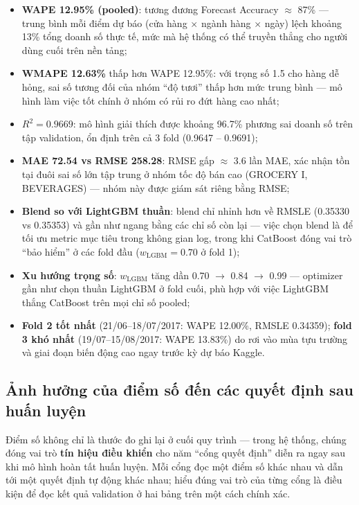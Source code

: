 \documentclass[12pt,a4paper]{report}
\begin{document}
\begin{itemize}
    \item \textbf{WAPE 12.95\% (pooled)}: tương đương Forecast Accuracy $\approx$ 87\% --- trung bình mỗi điểm dự báo (cửa hàng $\times$ ngành hàng $\times$ ngày) lệch khoảng 13\% tổng doanh số thực tế, mức mà hệ thống có thể truyền thẳng cho người dùng cuối trên nền tảng;
    \item \textbf{WMAPE 12.63\%} thấp hơn WAPE 12.95\%: với trọng số 1.5 cho hàng dễ hỏng, sai số tương đối của nhóm ``độ tươi'' thấp hơn mức trung bình --- mô hình làm việc tốt chính ở nhóm có rủi ro đứt hàng cao nhất;
    \item \textbf{$R^2 = 0.9669$}: mô hình giải thích được khoảng 96.7\% phương sai doanh số trên tập validation, ổn định trên cả 3 fold (0.9647 -- 0.9691);
    \item \textbf{MAE 72.54 vs RMSE 258.28}: RMSE gấp $\approx$ 3.6 lần MAE, xác nhận tồn tại đuôi sai số lớn tập trung ở nhóm tốc độ bán cao (GROCERY I, BEVERAGES) --- nhóm này được giám sát riêng bằng RMSE;
    \item \textbf{Blend so với LightGBM thuần}: blend chỉ nhỉnh hơn về RMSLE (0.35330 vs 0.35353) và gần như ngang bằng các chỉ số còn lại --- việc chọn blend là để tối ưu metric mục tiêu trong không gian log, trong khi CatBoost đóng vai trò ``bảo hiểm'' ở các fold đầu ($w_{\mathrm{LGBM}} = 0.70$ ở fold 1);
    \item \textbf{Xu hướng trọng số}: $w_{\mathrm{LGBM}}$ tăng dần 0.70 $\rightarrow$ 0.84 $\rightarrow$ 0.99 --- optimizer gần như chọn thuần LightGBM ở fold cuối, phù hợp với việc LightGBM thắng CatBoost trên mọi chỉ số pooled;
    \item \textbf{Fold 2 tốt nhất} (21/06--18/07/2017: WAPE 12.00\%, RMSLE 0.34359); \textbf{fold 3 khó nhất} (19/07--15/08/2017: WAPE 13.83\%) do rơi vào mùa tựu trường và giai đoạn biến động cao ngay trước kỳ dự báo Kaggle.
\end{itemize}

\subsection{Ảnh hưởng của điểm số đến các quyết định sau huấn luyện}

Điểm số không chỉ là thước đo ghi lại ở cuối quy trình --- trong hệ thống, chúng đóng
vai trò \textbf{tín hiệu điều khiển} cho năm ``cổng quyết định'' diễn ra ngay sau khi
mô hình hoàn tất huấn luyện. Mỗi cổng đọc một điểm số khác nhau và dẫn tới một quyết
định tự động khác nhau; hiểu đúng vai trò của từng cổng là điều kiện để đọc kết quả
validation ở hai bảng trên một cách chính xác.
\end{document}
